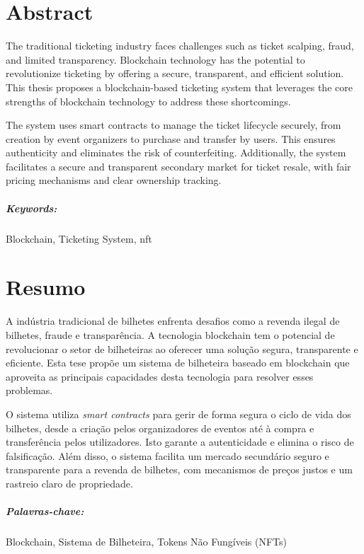 \chapter*{Abstract}

The traditional ticketing industry faces challenges such as ticket scalping,
fraud, and limited transparency. Blockchain technology has the potential to
revolutionize ticketing by offering a secure, transparent, and efficient
solution. This thesis proposes a blockchain-based ticketing system that
leverages the core strengths of blockchain technology to address these
shortcomings.

The system uses smart contracts to manage the ticket lifecycle securely, from
creation by event organizers to purchase and transfer by users. This ensures
authenticity and eliminates the risk of counterfeiting. Additionally, the
system facilitates a secure and transparent secondary market for ticket resale,
with fair pricing mechanisms and clear ownership tracking.

\paragraph{Keywords:} Blockchain, Ticketing System, \gls{nft}

\chapter*{Resumo}

A indústria tradicional de bilhetes enfrenta desafios como a revenda ilegal de
bilhetes, fraude e transparência. A tecnologia blockchain tem o potencial de
revolucionar o setor de bilheteiras ao oferecer uma solução segura,
transparente e eficiente. Esta tese propõe um sistema de bilheteira baseado em
blockchain que aproveita as principais capacidades desta tecnologia para
resolver esses problemas.

O sistema utiliza \textit{smart contracts} para gerir de forma segura o ciclo
de vida dos bilhetes, desde a criação pelos organizadores de eventos até à
compra e transferência pelos utilizadores. Isto garante a autenticidade e
elimina o risco de falsificação. Além disso, o sistema facilita um mercado
secundário seguro e transparente para a revenda de bilhetes, com mecanismos de
preços justos e um rastreio claro de propriedade.

\paragraph{Palavras-chave:} Blockchain, Sistema de Bilheteira, Tokens Não Fungíveis (NFTs)
